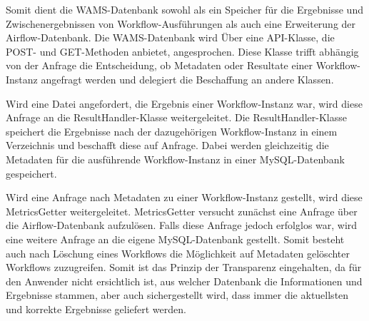 Somit dient die WAMS-Datenbank sowohl als ein Speicher für die Ergebnisse und Zwischenergebnissen von Workflow-Ausführungen als auch eine Erweiterung der Airflow-Datenbank. Die WAMS-Datenbank wird Über eine API-Klasse, die POST- und GET-Methoden anbietet, angesprochen. Diese Klasse trifft abhängig von der Anfrage die Entscheidung, ob Metadaten oder Resultate einer Workflow-Instanz angefragt werden und delegiert die Beschaffung an andere Klassen.

Wird eine Datei angefordert, die Ergebnis einer Workflow-Instanz war, wird diese Anfrage an
die ResultHandler-Klasse weitergeleitet. Die ResultHandler-Klasse speichert die Ergebnisse
nach der dazugehörigen Workflow-Instanz in einem Verzeichnis und beschafft diese auf
Anfrage. Dabei werden gleichzeitig die Metadaten für die ausführende Workflow-Instanz
in einer MySQL-Datenbank gespeichert.

Wird eine Anfrage nach Metadaten zu einer Workflow-Instanz gestellt, wird diese 
MetricsGetter weitergeleitet. MetricsGetter versucht zunächst eine Anfrage über die
Airflow-Datenbank aufzulösen. Falls diese Anfrage jedoch erfolglos war, wird eine weitere
Anfrage an die eigene MySQL-Datenbank gestellt. Somit besteht auch nach Löschung eines 
Workflows die Möglichkeit auf Metadaten gelöschter Workflows zuzugreifen. Somit ist das Prinzip der Transparenz eingehalten, da für den Anwender nicht ersichtlich ist, aus welcher Datenbank die Informationen und Ergebnisse stammen, aber auch sichergestellt wird, dass immer die aktuellsten und korrekte Ergebnisse geliefert werden.